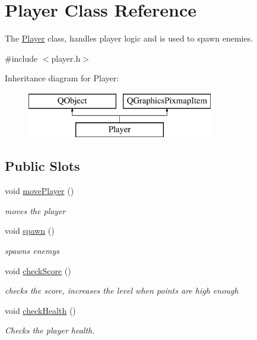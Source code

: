 \hypertarget{classPlayer}{}\section{Player Class Reference}
\label{classPlayer}


The \hyperlink{classPlayer}{Player} class, handles player logic and is used to spawn enemies.  




{\ttfamily \#include $<$player.\+h$>$}

Inheritance diagram for Player\+:\begin{figure}[H]
\begin{center}
\leavevmode
\includegraphics[height=2.000000cm]{classPlayer}
\end{center}
\end{figure}
\subsection*{Public Slots}
\begin{DoxyCompactItemize}
\item 
\mbox{\label{classPlayer_a60c45a096af43067179eb8c805e1e76d}} 
void \hyperlink{classPlayer_a60c45a096af43067179eb8c805e1e76d}{move\+Player} ()
\begin{DoxyCompactList}\small\item\em moves the player \end{DoxyCompactList}\item 
\mbox{\label{classPlayer_a59ae3f2c7151032a85e58b1591cad769}} 
void \hyperlink{classPlayer_a59ae3f2c7151032a85e58b1591cad769}{spawn} ()
\begin{DoxyCompactList}\small\item\em spawns enemys \end{DoxyCompactList}\item 
\mbox{\label{classPlayer_aa7a25ab9a055e6483c5af1940ce28b74}} 
void \hyperlink{classPlayer_aa7a25ab9a055e6483c5af1940ce28b74}{check\+Score} ()
\begin{DoxyCompactList}\small\item\em checks the score, increases the level when points are high enough \end{DoxyCompactList}\item 
\mbox{\label{classPlayer_a615de784bd638d443df5d828535d4018}} 
void \hyperlink{classPlayer_a615de784bd638d443df5d828535d4018}{check\+Health} ()
\begin{DoxyCompactList}\small\item\em Checks the player health. \end{DoxyCompactList}\end{DoxyCompactItemize}
